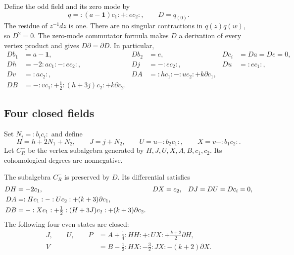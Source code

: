 Define the odd field and its zero mode by
\begin{equation}\label{eq:cbc27-q}
 q=:(a-\mathbf1)c_1:+:ec_2:,
 \qquad D=q_{(0)}.
\end{equation}
The residue of $z^{-1}dz$ is one.
There are no singular contractions in $q(z)q(w)$, so $D^2=0$.
The zero-mode commutator formula makes $D$ a derivation of every vertex product and gives $D\partial=\partial D$.
In particular,
\begin{align*}
 Db_1&=a-\mathbf1,&Db_2&=e,&Dc_i&=Da=De=0,\\
 Dh&=-2:ac_1:-:ec_2:,&Dj&=-:ec_2:,&Du&=:ec_1:,\\
 Dv&=:ac_2:,&DA&=:hc_1:-:uc_2:+k\partial c_1,\\
 DB&=-:vc_1:+\tfrac12:(h+3j)c_2:+k\partial c_2.
\end{align*}

\subsection{Four closed fields}

Set $N_i=:b_ic_i:$ and define
\begin{equation}\label{eq:cbc27-modified}
 H=h+2N_1+N_2,\qquad J=j+N_2,\qquad
 U=u-:b_2c_1:,\qquad X=v-:b_1c_2:.
\end{equation}
Let $C_R^-$ be the vertex subalgebra generated by $H,J,U,X,A,B,c_1,c_2$.
Its cohomological degrees are nonnegative.

\begin{lemma}\label{lem:cbc27-closed}
The subalgebra $C_R^-$ is preserved by $D$.
Its differential satisfies
\begin{align}
 DH&=-2c_1,&DX&=c_2,&DJ&=DU=Dc_i=0,\label{eq:cbc27-doublets}\\
 DA&=:Hc_1:-:Uc_2:+(k+3)\partial c_1,\notag\\
 DB&=-:Xc_1:+\tfrac12:(H+3J)c_2:+(k+3)\partial c_2.\notag
\end{align}
The following four even states are closed:
\begin{equation}\label{eq:cbc27-generators}
 \begin{split}
 J,\qquad U,\qquad
 P&=A+\tfrac14:HH:+:UX:+\tfrac{k+2}{2}\partial H,\\
 V&=B-\tfrac12:HX:-\tfrac32:JX:-(k+2)\partial X.
 \end{split}
\end{equation}
\end{lemma}

